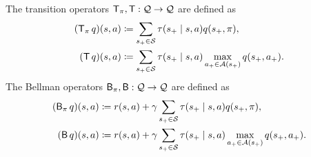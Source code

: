 \begin{definition}
\label{def: bellman operators}
The transition operators $\operatorname{\mathsf{T}}_\pi, \operatorname{\mathsf{T}} : \mathcal{Q} \to \mathcal{Q}$ are defined as
\begin{align*}
    (\operatorname{\mathsf{T}}_{\pi} q)(s,a) &\coloneqq \sum_{s_+ \in \mathcal{S}} \tau(s_+ \mid s,a) q(s_+,\pi) ,
    \\
    (\operatorname{\mathsf{T}} q)(s,a) &\coloneqq \sum_{s_+ \in \mathcal{S}} \tau(s_+ \mid s,a) \max_{a_+ \in \mathcal{A}(s_+)} q(s_+, a_+) .
\end{align*}
The Bellman operators $\operatorname{\mathsf{B}}_\pi, \operatorname{\mathsf{B}} : \mathcal{Q} \to \mathcal{Q}$ are defined as
\begin{align*}
    (\operatorname{\mathsf{B}}_\pi q) (s,a) &\coloneqq r(s,a) + \gamma \sum_{s_+ \in \mathcal{S}} \tau(s_+ \mid s,a) q(s_+, \pi) ,
    \\
    (\operatorname{\mathsf{B}} q)(s,a) &\coloneqq r(s,a) + \gamma \sum_{s_+ \in \mathcal{S}} \tau(s_+ \mid s,a) \max_{a_+ \in \mathcal{A}(s_+)} q(s_+,a_+) .
\end{align*}
\end{definition}